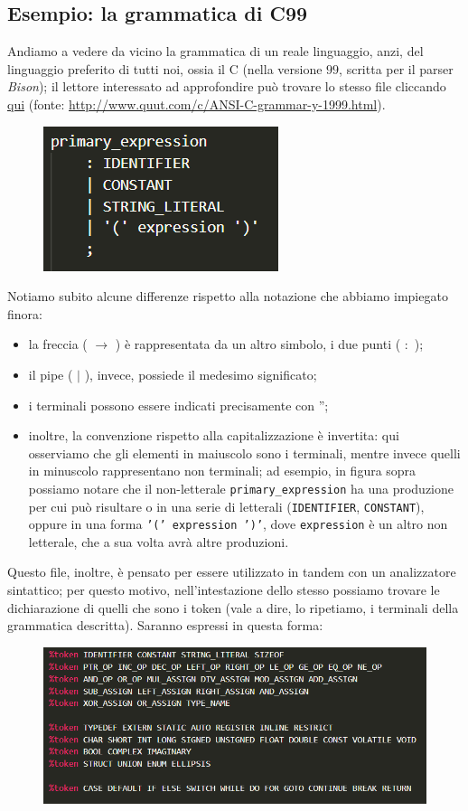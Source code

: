 \documentclass[class=book, crop=false, oneside, 12pt]{standalone}
\begin{document}
\subsection{Esempio: la grammatica di C99}
Andiamo a vedere da vicino la grammatica di un reale linguaggio, anzi, del linguaggio preferito di tutti noi, ossia il C (nella versione \(99\), scritta per il parser \emph{Bison}); il lettore interessato ad approfondire può trovare lo stesso file cliccando \href{./assets/files/c99.y}{qui} (fonte: \url{http://www.quut.com/c/ANSI-C-grammar-y-1999.html}).
\begin{figure}[H]
    \centering
    \includegraphics[width=.4\textwidth,keepaspectratio]{c99-ex1}
    \caption{}
\end{figure}
Notiamo subito alcune differenze rispetto alla notazione che abbiamo impiegato finora: 
\begin{itemize}
    \item la freccia ( \(\to\) ) è rappresentata da un altro simbolo, i due punti ( \(:\) );
    \item il pipe ( \(\mid\) ), invece, possiede il medesimo significato;
    \item i terminali possono essere indicati precisamente con '';
    \item inoltre, la convenzione rispetto alla capitalizzazione è invertita: qui osserviamo che gli elementi in maiuscolo sono i terminali, mentre invece quelli in minuscolo rappresentano non terminali; ad esempio, in figura sopra possiamo notare che il non-letterale \texttt{primary\_expression} ha una produzione per cui può risultare o in una serie di letterali (\texttt{IDENTIFIER}, \texttt{CONSTANT}), oppure in una forma \texttt{'(' expression ')'}, dove \texttt{expression} è un altro non letterale, che a sua volta avrà altre produzioni.
\end{itemize}

Questo file, inoltre, è pensato per essere utilizzato in tandem con un analizzatore sintattico; per questo motivo, nell'intestazione dello stesso possiamo trovare le dichiarazione di quelli che sono i token (vale a dire, lo ripetiamo, i terminali della grammatica descritta). Saranno espressi in questa forma:
\begin{figure}[H]
    \centering
    \includegraphics[width=.7\textwidth,keepaspectratio]{c99-ex2}
    \caption{}
\end{figure}
\end{document}
